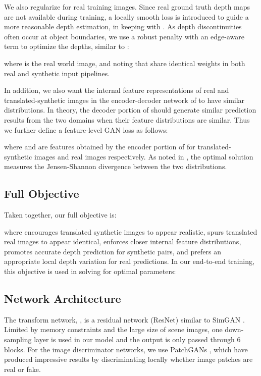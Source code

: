 \documentclass[runningheads]{llncs}
\begin{document}
We also regularize  for real training images. Since real ground truth depth maps are not available during training, a locally smooth loss is introduced to guide a more reasonable depth estimation, in keeping with \cite{heise2013pm,garg2016unsupervised,godard2017unsupervised,kuznietsov2017semi}. As depth discontinuities often occur at object boundaries, we use a robust penalty with an edge-aware term to optimize the depths, similar to \cite{godard2017unsupervised}:

where  is the real world image, and noting that  share identical weights in both real and synthetic input pipelines.

In addition, we also want the internal feature representations of real and translated-synthetic images in the encoder-decoder network of  to have similar distributions\cite{ganin2015unsupervised}. In theory, the decoder portion of  should generate similar prediction results from the two domains when their feature distributions are similar. Thus we further define a feature-level GAN loss as follows:
  
where  and  are features obtained by the encoder portion of  for translated-synthetic images and real images respectively. As noted in \cite{goodfellow2014generative}, the optimal solution measures the Jensen-Shannon divergence between the two distributions.

\subsection{Full Objective}

Taken together, our full objective is:

where  encourages translated synthetic images to appear realistic,  spurs translated real images to appear identical,  enforces closer internal feature distributions,  promotes accurate depth prediction for synthetic pairs, and  prefers an appropriate local depth variation for real predictions. In our end-to-end training, this objective is used in solving for optimal  parameters:



\subsection{Network Architecture}

The transform network, , is a residual network (ResNet) \cite{he2016deep} similar to SimGAN \cite{shrivastava2017learning}. Limited by memory constraints and the large size of scene images, one down-sampling layer is used in our model and the output is only passed through 6 blocks. For the image discriminator networks, we use PatchGANs \cite{shrivastava2017learning,zhu2017unpaired}, which have produced impressive results by discriminating locally whether image patches are real or fake.
\end{document}
